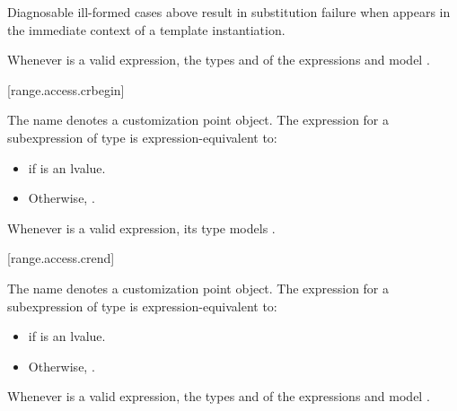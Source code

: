 \pnum
\begin{note}
Diagnosable ill-formed cases above
result in substitution failure when 
appears in the immediate context of a template instantiation.
\end{note}

\pnum
\begin{note}
Whenever  is a valid expression,
the types  and  of the expressions
 and 
model .
\end{note}

[range.access.crbegin]{}
%

\pnum
The name  denotes a customization point
object. The expression
 for a subexpression  of type
 is expression-equivalent to:
\begin{itemize}
\item {} if  is
  an lvalue.
\item Otherwise, .
\end{itemize}

\pnum
\begin{note}
Whenever  is a valid expression, its
type models .
\end{note}

[range.access.crend]{}
%

\pnum
The name  denotes a customization point
object. The expression
 for a subexpression  of type 
is expression-equivalent to:
\begin{itemize}
\item {} if  is an lvalue.

\item Otherwise, .
\end{itemize}

\pnum
\begin{note}
Whenever  is a valid expression,
the types  and  of the expressions
 and 
model .
\end{note}

